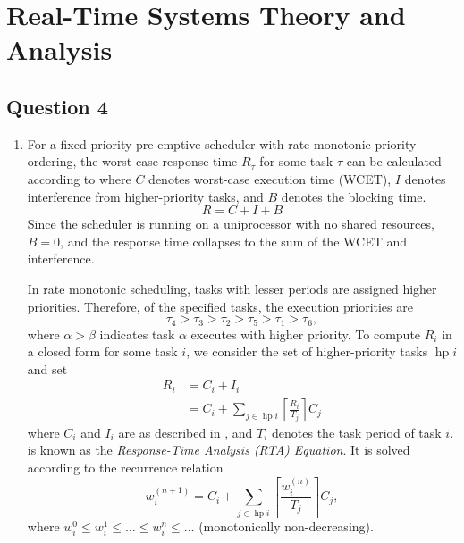 \documentclass{article}
\numberwithin{equation}{section}
\numberwithin{table}{section}
\numberwithin{figure}{section}
\DeclareMathOperator\hp{hp}
\begin{document}
\section{Real-Time Systems Theory and Analysis}
\subsection{Question 4}
\begin{enumerate}
    \item For a fixed-priority pre-emptive scheduler with rate monotonic
        priority ordering, the worst-case response time $R_\tau$ for some task
        $\tau$ can be calculated according to  where $C$
        denotes worst-case execution time (WCET), $I$ denotes interference from
        higher-priority tasks, and $B$ denotes the blocking time.
        \begin{equation}
            R = C + I + B
            \label{eqn:response-time}
        \end{equation}
        Since the scheduler is running on a uniprocessor with no shared
        resources, $B = 0$, and the response time collapses to the sum of the
        WCET and interference.

        In rate monotonic scheduling, tasks with lesser periods are assigned
        higher priorities. Therefore, of the specified tasks, the execution
        priorities are
        \begin{equation}
            \tau_4 > \tau_3 > \tau_2 > \tau_5 > \tau_1 > \tau_6,
        \end{equation}
        where $\alpha > \beta$ indicates task $\alpha$ executes with higher
        priority. To compute $R_i$ in a closed form for some task $i$, we
        consider the set of higher-priority tasks $\hp{i}$ and set
        \begin{align}
            R_i &= C_i + I_i \\
            &= C_i + \sum_{j\in\hp{i}} \left\lceil \frac{R_i}{T_j}
                \right\rceil C_j
            \label{eqn:rta}
        \end{align}
        where $C_i$ and $I_i$ are as described in , and
        $T_i$ denotes the task period of task $i$.  is known as
        the \emph{Response-Time Analysis \emph{(RTA)} Equation}. It is solved
        according to the recurrence relation
        \begin{equation}
            w_i^{(n+1)} = C_i + \sum_{j\in\hp{i}} \left\lceil
                \frac{w_i^{(n)}}{T_j} \right\rceil C_j,
        \end{equation}
        where $w_i^0 \leq w_i^1 \leq \ldots \leq w_i^n \leq \ldots$
        (monotonically non-decreasing).


\end{enumerate}
\end{document}
